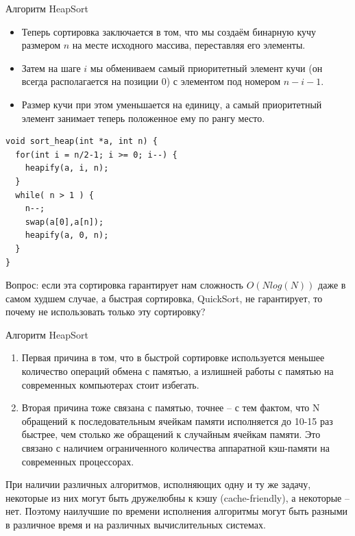 \documentclass{beamer}
\begin{document}
\begin{frame}[fragile]{Алгоритм HeapSort}
	\begin{itemize}
		\item Теперь сортировка заключается в том, что мы создаём бинарную кучу размером $n$ на месте исходного массива, переставляя его элементы. 
		\item Затем на шаге $i$ мы обмениваем самый приоритетный элемент кучи (он всегда располагается на позиции $0$) с элементом под номером $n-i-1$. 
		\item Размер кучи при этом уменьшается на единицу, а самый приоритетный элемент занимает теперь положенное ему по рангу место.
	\end{itemize}
\end{frame}

\begin{frame}[fragile]
	\begin{verbatim}
void sort_heap(int *a, int n) {
  for(int i = n/2-1; i >= 0; i--) {
    heapify(a, i, n);
  }
  while( n > 1 ) {
    n--;
    swap(a[0],a[n]);
    heapify(a, 0, n);
  }
}
	\end{verbatim}
	
	Вопрос: если эта сортировка гарантирует нам сложность $O(N log(N))$ даже в самом худшем случае, а быстрая сортировка, QuickSort, не гарантирует, то почему не использовать только эту сортировку? 
\end{frame}

\begin{frame}[fragile]{Алгоритм HeapSort}
	\begin{enumerate}
		\item Первая причина в том, что в быстрой сортировке используется меньшее количество операций обмена с памятью, а излишней работы с памятью на современных компьютерах стоит избегать. 
		\item Вторая причина тоже связана с памятью, точнее -- с тем фактом, что N обращений к последовательным
ячейкам памяти исполняется до 10-15 раз быстрее, чем столько же обращений к случайным ячейкам памяти. Это связано с наличием ограниченного количества аппаратной кэш-памяти на современных процессорах. 
	\end{enumerate}
	При наличии различных алгоритмов, исполняющих одну и ту же задачу, некоторые из них могут быть дружелюбны к кэшу (cache-friendly), а некоторые -- нет. Поэтому наилучшие по времени исполнения алгоритмы могут быть разными в различное время и на различных вычислительных системах.	
\end{frame}
\end{document}
